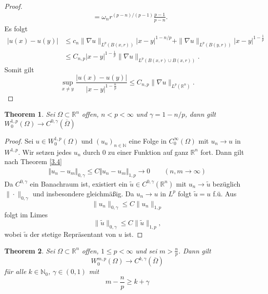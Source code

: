 \documentclass[
paper=a4,
bibtotocnumbered,
liststotocnumbered,
tablecaptionabove,
pointlessnumbers,
twoside,
openright,
10pt
]
{report}
\newtheorem{thm}{Theorem}[chapter]
\theoremstyle{definition}
\numberwithin{equation}{chapter}
\begin{document}
\begin{proof}
\begin{align*}
	&= \omega_n r^{(p-n)/(p-1)}\frac{p-1}{p-n}.
\end{align*}
Es folgt
\begin{align*}
	|u(x)-u(y)| &\le c_n \| \nabla u\|_{L^p(B(x,r))} |x-y|^{1-n/p} +\| \nabla u\|_{L^p(B(y,r))} |x-y|^{1-\frac{1}{p}}\\
&\le C_{n,p} |x-y|^{1-\frac{1}{p}}\|\nabla u \|_{L^p(B(x,r)\cup B(x,r))}.
\end{align*}
Somit gilt
\begin{equation}
	\sup_{x\ne y} \frac{|u(x)-u(y)|}{{|x-y|}^{1-\frac{n}{p}}} \le C_{n,p} \| \nabla u\|_{L^p(\mathbb R^n)}.
\end{equation}
\end{proof}

\begin{thm}\label{3.5}
	Sei $\Omega \subset \mathbb R^n$ offen, $n<p<\infty$ und $\gamma = 1- n/p$, dann gilt $W_0^{1,p}(\Omega) \to C^{0,\gamma}(\overline{\Omega})$
\end{thm}
\begin{proof}
	Sei $u\in W_0^{1,p}(\Omega)$ und $(u_n)_{n \in \mathbb{N}}$ eine Folge in $C_0^\infty(\Omega)$ mit $u_n \to u$ in $W^{1,p}$. Wir setzen  jedes $u_n$ durch $0$ zu einer Funktion auf ganz $\mathbb R^n$ fort. Dann gilt nach Theorem \ref{3.4} 
	\begin{align*}
	\Vert u_n - u_m \Vert_{0, \gamma} \leq C \Vert u_n - u_m \Vert_{1,p} \rightarrow 0 \qquad (n,m \rightarrow \infty)
	\end{align*}
Da $C^{0,\gamma}$ ein Banachraum ist, existiert ein $\tilde u \in C^{0,\gamma}(\mathbb R^n)$ mit $u_n\to \tilde u$ bezüglich $\| \cdot \|_{0,\gamma}$ und insbesondere gleichmäßig. Da $u_n \to u$ in $L^p$ folgt $\tilde u =u$ f.ü. Aus 
	\begin{equation}
		\|u_n\|_{0,\gamma} \le C \|u_n\|_{1,p}
	\end{equation}
folgt im Limes 
	\begin{equation}
		\|\tilde u \|_{0,\gamma} \le C\| \tilde u\|_{1,p},
	\end{equation}
	wobei $\tilde u$ der stetige Repräsentant von $u$ ist.
\end{proof}
\begin{thm}
	Sei $\Omega \subset \mathbb R^n$ offen, $1\le p < \infty$ und sei $m>\frac{n}{p}$. Dann gilt
	\begin{equation}
	W_0^{m,p}(\Omega) \to C^{k, \gamma}(\overline{\Omega})
	\end{equation}
	für alle $k\in \mathbb N_0$, $\gamma \in (0,1)$ mit 
	\begin{equation}
	m-\frac{n}{p} \ge k + \gamma
\end{equation}
\end{thm}
\end{document}
